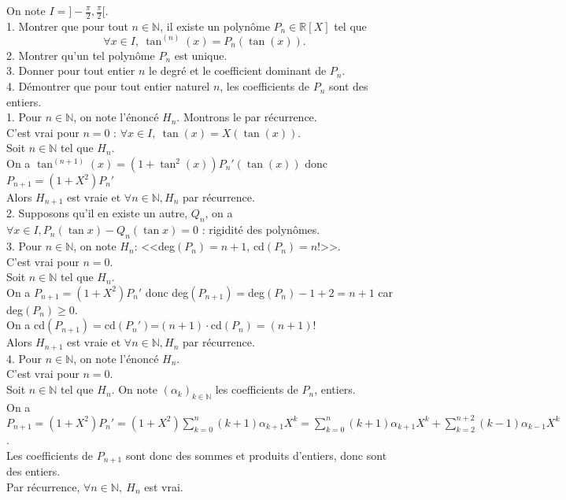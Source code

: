 \documentclass[10pt]{article}
\begin{document}
\begin{tcolorbox}[enhanced, width=7.6in, center, size=fbox, fontupper=\large, drop shadow southwest]
    On note $I=]-\frac{\pi}{2},\frac{\pi}{2}[$.\\
    1. Montrer que pour tout $n\in\mathbb{N}$, il existe un polynôme $P_n\in\mathbb{R}[X]$ tel que
    \begin{equation*}
        \forall x \in I, ~ \tan^{(n)}(x)=P_n(\tan(x)).
    \end{equation*}
    2. Montrer qu'un tel polynôme $P_n$ est unique.\\
    3. Donner pour tout entier $n$ le degré et le coefficient dominant de $P_n$.\\
    4. Démontrer que pour tout entier naturel $n$, les coefficients de $P_n$ sont des entiers.\\[0.3cm]
    1. Pour $n\in\mathbb{N}$, on note l'énoncé $H_n$. Montrons le par récurrence.\\
    C'est vrai pour $n=0$ : $\forall x\in I, ~ \tan(x)=X(\tan(x))$.\\
    Soit $n\in\mathbb{N}$ tel que $H_n$.\\
    On a $\tan^{(n+1)}(x)=(1+\tan^2(x))P_n'(\tan(x))$ donc $P_{n+1}=(1+X^2)P_n'$\\
    Alors $H_{n+1}$ est vraie et $\forall n\in\mathbb{N}, H_n$ par récurrence.\\[0.2cm]
    2. Supposons qu'il en existe un autre, $Q_n$, on a $\forall x\in I, P_n(\tan x) - Q_n(\tan x) = 0$ : rigidité des polynômes.\\[0.2cm]
    3. Pour $n\in\mathbb{N}$, on note $H_n$: <<deg$(P_n)=n+1$, cd$(P_n)=n!$>>.\\
    C'est vrai pour $n=0$.\\
    Soit $n\in\mathbb{N}$ tel que $H_n$.\\
    On a $P_{n+1}=(1+X^2)P_n'$ donc deg$(P_{n+1})=$deg$(P_n)-1+2=n+1$ car deg$(P_n)\geq0$.\\
    On a cd$(P_{n+1})=$cd$(P_n')$=$(n+1)\cdot$cd$(P_n)=(n+1)!$\\
    Alors $H_{n+1}$ est vraie et $\forall n \in \mathbb{N}, H_n$ par récurrence.\\[0.2cm]
    4. Pour $n\in\mathbb{N}$, on note l'énoncé $H_n$.\\
    C'est vrai pour $n=0$.\\
    Soit $n\in\mathbb{N}$ tel que $H_n$. On note $(\alpha_k)_{k\in\mathbb{N}}$ les coefficients de $P_n$, entiers.\\
    On a $P_{n+1}=(1+X^2)P_n'=(1+X^2)\sum\limits_{k=0}^{n}(k+1)\alpha_{k+1}X^{k}=\sum\limits_{k=0}^n(k+1)\alpha_{k+1}X^k+\sum\limits_{k=2}^{n+2}(k-1)\alpha_{k-1}X^{k}$.\\
    Les coefficients de $P_{n+1}$ sont donc des sommes et produits d'entiers, donc sont des entiers.\\
    Par récurrence, $\forall{n\in\mathbb{N}}, ~ H_n$ est vrai.
\end{tcolorbox}
\end{document}
